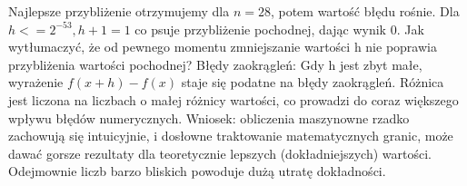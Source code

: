 \documentclass[12pt, letterpaper]{article}
\begin{document}
Najlepsze przybliżenie otrzymujemy dla $n=28$, potem wartość błędu rośnie.
Dla $h <= 2^{-53}, h + 1 = 1$ co psuje przybliżenie pochodnej, dając wynik 0.
Jak wytłumaczyć, że od pewnego momentu zmniejszanie wartości h nie poprawia
przybliżenia wartości pochodnej?
Błędy zaokrągleń: Gdy
h jest zbyt małe, wyrażenie $f(x + h) - f(x)$ staje się podatne na błędy
zaokrągleń. Różnica
jest liczona na liczbach o małej różnicy wartości, co prowadzi do coraz
większego wpływu błędów numerycznych.
Wniosek: obliczenia maszynowne rzadko zachowują się intuicyjnie, i dosłowne
traktowanie matematycznych granic, może dawać gorsze rezultaty dla teoretycznie
lepszych (dokładniejszych) wartości. Odejmownie liczb barzo bliskich powoduje dużą
utratę dokładności.
\end{document}

